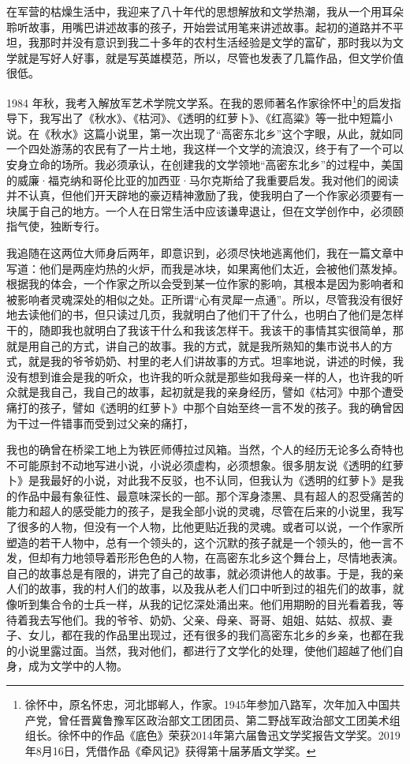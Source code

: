 \documentclass[12pt,a5paper]{ctexbook}
\begin{document}
在军营的枯燥生活中，我迎来了八十年代的思想解放和文学热潮，我从一个用耳朵聆听故事，用嘴巴讲述故事的孩子，开始尝试用笔来讲述故事。起初的道路并不平坦，我那时并没有意识到我二十多年的农村生活经验是文学的富矿，那时我以为文学就是写好人好事，就是写英雄模范，所以，尽管也发表了几篇作品，但文学价值很低。

1984 年秋，我考入解放军艺术学院文学系。在我的恩师著名作家徐怀中\footnote{徐怀中，原名怀忠，河北邯郸人，作家。1945年参加八路军，次年加入中国共产党，曾任晋冀鲁豫军区政治部文工团团员、第二野战军政治部文工团美术组组长。徐怀中的作品《底色》荣获2014年第六届鲁迅文学奖报告文学奖。2019年8月16日，凭借作品《牵风记》获得第十届茅盾文学奖。}的启发指导下，我写出了《秋水》、《枯河》、《透明的红萝卜》、《红高粱》等一批中短篇小说。在《秋水》这篇小说里，第一次出现了“高密东北乡”这个字眼，从此，就如同一个四处游荡的农民有了一片土地，我这样一个文学的流浪汉，终于有了一个可以安身立命的场所。我必须承认，在创建我的文学领地“高密东北乡”的过程中，美国的威廉·福克纳和哥伦比亚的加西亚·马尔克斯给了我重要启发。我对他们的阅读并不认真，但他们开天辟地的豪迈精神激励了我，使我明白了一个作家必须要有一块属于自己的地方。一个人在日常生活中应该谦卑退让，但在文学创作中，必须颐指气使，独断专行。

我追随在这两位大师身后两年，即意识到，必须尽快地逃离他们，我在一篇文章中写道：他们是两座灼热的火炉，而我是冰块，如果离他们太近，会被他们蒸发掉。根据我的体会，一个作家之所以会受到某一位作家的影响，其根本是因为影响者和被影响者灵魂深处的相似之处。正所谓“心有灵犀一点通”。所以，尽管我没有很好地去读他们的书，但只读过几页，我就明白了他们干了什么，也明白了他们是怎样干的，随即我也就明白了我该干什么和我该怎样干。我该干的事情其实很简单，那就是用自己的方式，讲自己的故事。我的方式，就是我所熟知的集市说书人的方式，就是我的爷爷奶奶、村里的老人们讲故事的方式。坦率地说，讲述的时候，我没有想到谁会是我的听众，也许我的听众就是那些如我母亲一样的人，也许我的听众就是我自己，我自己的故事，起初就是我的亲身经历，譬如《枯河》中那个遭受痛打的孩子，譬如《透明的红萝卜》中那个自始至终一言不发的孩子。我的确曾因为干过一件错事而受到过父亲的痛打，

我也的确曾在桥梁工地上为铁匠师傅拉过风箱。当然，个人的经历无论多么奇特也不可能原封不动地写进小说，小说必须虚构，必须想象。很多朋友说《透明的红萝卜》是我最好的小说，对此我不反驳，也不认同，但我认为《透明的红萝卜》是我的作品中最有象征性、最意味深长的一部。那个浑身漆黑、具有超人的忍受痛苦的能力和超人的感受能力的孩子，是我全部小说的灵魂，尽管在后来的小说里，我写了很多的人物，但没有一个人物，比他更贴近我的灵魂。或者可以说，一个作家所塑造的若干人物中，总有一个领头的，这个沉默的孩子就是一个领头的，他一言不发，但却有力地领导着形形色色的人物，在高密东北乡这个舞台上，尽情地表演。自己的故事总是有限的，讲完了自己的故事，就必须讲他人的故事。于是，我的亲人们的故事，我的村人们的故事，以及我从老人们口中听到过的祖先们的故事，就像听到集合令的士兵一样，从我的记忆深处涌出来。他们用期盼的目光看着我，等待着我去写他们。我的爷爷、奶奶、父亲、母亲、哥哥、姐姐、姑姑、叔叔、妻子、女儿，都在我的作品里出现过，还有很多的我们高密东北乡的乡亲，也都在我的小说里露过面。当然，我对他们，都进行了文学化的处理，使他们超越了他们自身，成为文学中的人物。
\end{document}
